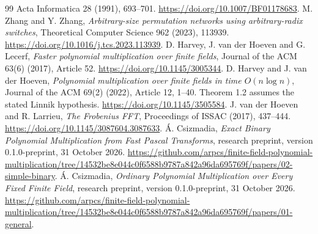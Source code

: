 \documentclass[11pt]{article}
\begin{document}
\begin{thebibliography}{99}
Acta Informatica 28 (1991), 693--701.
\url{https://doi.org/10.1007/BF01178683}.
 M. Zhang and Y. Zhang,
\emph{Arbitrary-size permutation networks using arbitrary-radix switches},
Theoretical Computer Science 962 (2023), 113939.
\url{https://doi.org/10.1016/j.tcs.2023.113939}.
 D. Harvey, J. van der Hoeven and G. Lecerf,
\emph{Faster polynomial multiplication over finite fields},
Journal of the ACM 63(6) (2017), Article 52.
\url{https://doi.org/10.1145/3005344}.
 D. Harvey and J. van der Hoeven,
\emph{Polynomial multiplication over finite fields in time $O(n\log n)$},
Journal of the ACM 69(2) (2022), Article 12, 1--40.
Theorem 1.2 assumes the stated Linnik hypothesis.
\url{https://doi.org/10.1145/3505584}.
 J. van der Hoeven and R. Larrieu,
\emph{The Frobenius FFT}, Proceedings of ISSAC (2017), 437--444.
\url{https://doi.org/10.1145/3087604.3087633}.
 \'A. Csizmadia,
\emph{Exact Binary Polynomial Multiplication from Fast Pascal Transforms},
research preprint, version 0.1.0-preprint, 31 October 2026.
\url{https://github.com/arpcs/finite-field-polynomial-multiplication/tree/14532be8e044c0f6588b9787a842a96da695769f/papers/02-simple-binary}.
 \'A. Csizmadia,
\emph{Ordinary Polynomial Multiplication over Every Fixed Finite Field},
research preprint, version 0.1.0-preprint, 31 October 2026.
\url{https://github.com/arpcs/finite-field-polynomial-multiplication/tree/14532be8e044c0f6588b9787a842a96da695769f/papers/01-general}.
\end{thebibliography}
\end{document}
